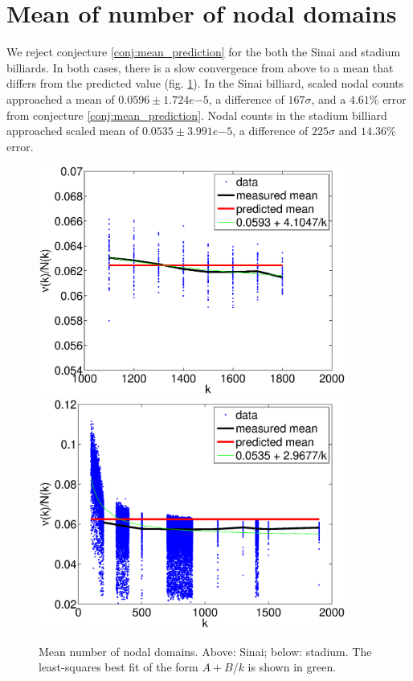 \documentclass{report}
\begin{document}
\section{Mean of number of nodal domains}
We reject conjecture \ref{conj:mean_prediction} for the both the Sinai and stadium billiards. In both cases, there is a slow convergence from above to a mean that differs from the predicted value (fig. \ref{fig:mean}). In the Sinai billiard, scaled nodal counts approached a mean of $0.0596 \pm 1.724e{-5}$, a difference of $167 \sigma$, and a $4.61\%$ error from conjecture \ref{conj:mean_prediction}. Nodal counts in the stadium billiard approached scaled mean of $0.0535 \pm 3.991e{-5}$, a difference of $225 \sigma$ and $14.36\%$ error.

\begin{figure}
  \begin{center}
    \includegraphics[width=0.9\textwidth]{figs/results/qugrs_all_mean.eps}
    \includegraphics[width=0.9\textwidth]{figs/results/qust_all_mean.eps}
    \caption{Mean number of nodal domains. Above: Sinai; below: stadium. The least-squares best fit of the form $A + B/k$ is shown in green.}
    \label{fig:mean}
  \end{center}
\end{figure}
\end{document}

